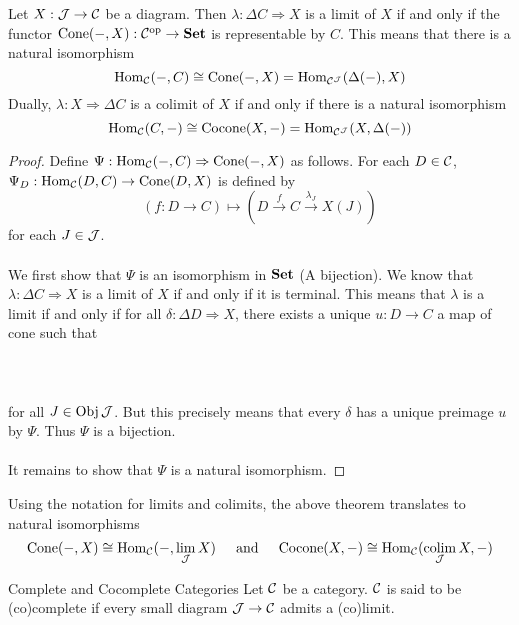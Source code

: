 \documentclass[a4paper]{article}
\begin{document}
\begin{thm}{}{} Let $X:\mathcal{J}\to\mathcal{C}$ be a diagram. Then $\lambda:\Delta C\Rightarrow X$ is a limit of $X$ if and only if the functor $\text{Cone}(-,X):\mathcal{C}^\text{op}\to\bold{Set}$ is representable by $C$. This means that there is a natural isomorphism $$\operatorname{Hom}_{\mathcal{C}}(-,C)\cong\text{Cone}(-,X)=\operatorname{Hom}_{\mathcal{C}^{\mathcal{J}}}(\Delta(-),X)$$ 
Dually, $\lambda:X\Rightarrow\Delta C$ is a colimit of $X$ if and only if there is a natural isomorphism $$\operatorname{Hom}_{\mathcal{C}}(C,-)\cong\text{Cocone}(X,-)=\operatorname{Hom}_{\mathcal{C}^{\mathcal{J}}}(X,\Delta(-))$$ \tcbline
\begin{proof}
Define $\Psi:\operatorname{Hom}_{\mathcal{C}}(-,C)\Rightarrow\text{Cone}(-,X)$ as follows. For each $D\in\mathcal{C}$, $\Psi_D:\operatorname{Hom}_{\mathcal{C}}(D,C)\to\text{Cone}(D,X)$ is defined by $$(f:D\to C)\mapsto\left(D\overset{f}{\rightarrow}C\overset{\lambda_J}{\rightarrow}X(J)\right)$$ for each $J\in\mathcal{J}$. \\~\\

We first show that $\Psi$ is an isomorphism in $\bold{Set}$ (A bijection). We know that $\lambda:\Delta C\Rightarrow X$ is a limit of $X$ if and only if it is terminal. This means that $\lambda$ is a limit if and only if for all $\delta:\Delta D\Rightarrow X$, there exists a unique $u:D\to C$ a map of cone such that \\~\\
\\~\\
for all $J\in\operatorname{Obj}\mathcal{J}$. But this precisely means that every $\delta$ has a unique preimage $u$ by $\Psi$. Thus $\Psi$ is a bijection. \\~\\

It remains to show that $\Psi$ is a natural isomorphism. 
\end{proof}
\end{thm}

Using the notation for limits and colimits, the above theorem translates to natural isomorphisms $$\text{Cone}(-,X)\cong\operatorname{Hom}_{\mathcal{C}}(-,\lim_{\mathcal{J}} X)\;\;\;\;\text{ and }\;\;\;\;\text{Cocone}(X,-)\cong\operatorname{Hom}_{\mathcal{C}}(\operatorname*{colim}_{\mathcal{J}} X,-)$$

\begin{defn}{Complete and Cocomplete Categories}{} Let $\mathcal{C}$ be a category. $\mathcal{C}$ is said to be (co)complete if every small diagram $\mathcal{J}\to\mathcal{C}$ admits a (co)limit. 
\end{defn}
\end{document}
